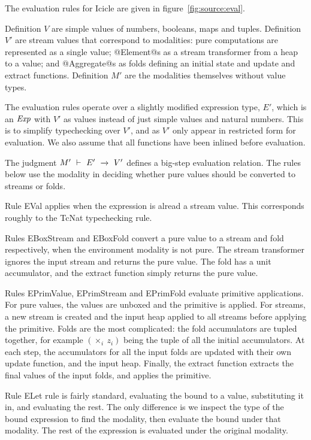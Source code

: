 The evaluation rules for Icicle are given in figure~\ref{fig:source:eval}.

Definition $V$ are simple values of numbers, booleans, maps and tuples.
Definition $V'$ are stream values that correspond to modalities: pure computations are represented as a single value;
@Element@s as a stream transformer from a heap to a value;
and @Aggregate@s as folds defining an initial state and update and extract functions.
Definition $M'$ are the modalities themselves without value types.


The evaluation rules operate over a slightly modified expression type, $E'$, which is an $\mathit{Exp}$ with $V'$ as values instead of just simple values and natural numbers.
This is to simplify typechecking over $V'$, and as $V'$ only appear in restricted form for evaluation.
We also assume that all functions have been inlined before evaluation.

The judgment $M'~\vdash~E'~\xrightarrow~~V'$ defines a big-step evaluation relation.
The rules below use the modality in deciding whether pure values should be converted to streams or folds.

Rule EVal applies when the expression is alread a stream value.
This corresponds roughly to the TcNat typechecking rule.

Rules EBoxStream and EBoxFold convert a pure value to a stream and fold respectively, when the environment modality is not pure.
The stream transformer ignores the input stream and returns the pure value.
The fold has a unit accumulator, and the extract function simply returns the pure value.

Rules EPrimValue, EPrimStream and EPrimFold evaluate primitive applications.
For pure values, the values are unboxed and the primitive is applied.
For streams, a new stream is created and the input heap applied to all streams before applying the primitive.
Folds are the most complicated: the fold accumulators are tupled together, for example $(\times_i~z_i)$ being the tuple of all the initial accumulators.
At each step, the accumulators for all the input folds are updated with their own update function, and the input heap.
Finally, the extract function extracts the final values of the input folds, and applies the primitive.

Rule ELet rule is fairly standard, evaluating the bound to a value, substituting it in, and evaluating the rest.
The only difference is we inspect the type of the bound expression to find the modality, then evaluate the bound under that modality.
The rest of the expression is evaluated under the original modality.


